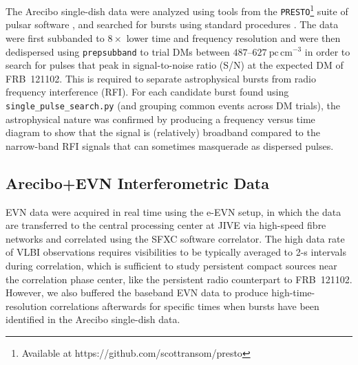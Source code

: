 \documentclass[twocolumn]{aastex61}
\newcommand{\frb}{FRB~121102\xspace}
\begin{document}
The Arecibo single-dish data were analyzed using tools from the {\tt PRESTO}\footnote{Available at https://github.com/scottransom/presto} suite of pulsar software \citep{ran01}, and searched for bursts using standard procedures \citep[e.g.,][]{ssh+16b}.  The data were first subbanded to $8\times$ lower time and frequency resolution and were then dedispersed using {\tt prepsubband} to trial DMs between $487$--$627\ \mathrm{pc\,cm^{-3}}$ in order to search for pulses that peak in signal-to-noise ratio (S/N) at the expected DM of \frb. This is required to separate astrophysical bursts from radio frequency interference (RFI).  For each candidate burst found using {\tt single\_pulse\_search.py} (and grouping common events across DM trials), the astrophysical nature was confirmed by producing a frequency versus time diagram to show that the signal is (relatively) broadband compared to the narrow-band RFI signals that can sometimes masquerade as dispersed pulses.

\subsection{Arecibo+EVN Interferometric Data}

EVN data were acquired in real time using the e-EVN setup, in which the data are transferred to the central processing center at JIVE via high-speed fibre networks and correlated using the SFXC software correlator. The high data rate of VLBI observations requires visibilities to be typically averaged to 2-s intervals during correlation, which is sufficient to study persistent compact sources near the correlation phase center, like the persistent radio counterpart to \frb. However, we also buffered the baseband EVN data to produce high-time-resolution correlations afterwards for specific times when bursts have been identified in the Arecibo single-dish data.
\end{document}
